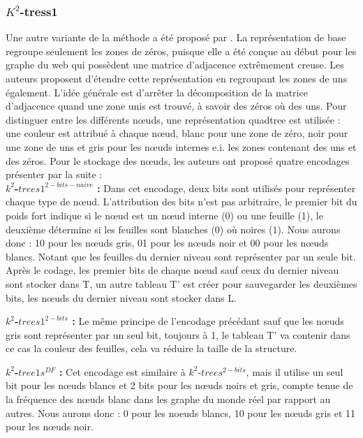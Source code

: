 \subsubsection{$K^2$-tress1 }
Une autre variante de la méthode a été proposé par \citep{de2014new}. La représentation de base regroupe seulement les zones de zéros, puisque elle a été conçue au début pour les graphe du web qui possèdent une matrice d'adjacence extrêmement creuse. Les auteurs proposent d'étendre cette représentation en regroupant les zones de uns également. L'idée générale est d'arrêter la décomposition de la matrice d'adjacence quand une zone unis est trouvé, à savoir des zéros où des uns. Pour distinguer entre les différents nœuds, une représentation quadtree est utilisée \citep{de1997computational} : une couleur est attribué à chaque nœud, blanc pour une zone de zéro, noir pour une zone de uns et gris pour les nœuds internes e.i. les zones contenant des uns et des zéros. Pour le stockage des nœuds, les auteurs ont proposé quatre encodages présenter par la suite : \\

\textbf{ $k^2$-$trees1^{2-bits-naive}$ :} Dans cet encodage, deux bits sont utilisés pour représenter chaque type de nœud. L'attribution des bits n'est pas arbitraire, le premier bit du poids fort indique si le nœud est un nœud interne (0) ou une feuille (1), le deuxième détermine si les feuilles sont blanches (0) où noires (1). Nous aurons donc : 10 pour les nœuds gris, 01 pour les nœuds noir et 00 pour les nœuds blancs. Notant que les feuilles du dernier niveau sont représenter par un seule bit.
Après le codage, les premier bits de chaque nœud sauf ceux du dernier niveau sont stocker dans T, un autre tableau T' est créer pour sauvegarder les deuxièmes bits, les nœuds du dernier niveau sont stocker dans L.

\textbf{ $k^2$-$trees1^{2-bits}$ :} Le même principe de l'encodage précédant sauf que les nœuds gris sont représenter par un seul bit, toujours à 1, le tableau T' va contenir dans ce cas la couleur des feuilles, cela va réduire la taille de la structure.

\textbf{ $k^2$-$tree1s^{DF}$ :} Cet encodage est similaire à $k^2$-$trees^{2-bits}$, mais il utilise un seul bit pour les nœuds blancs et 2 bits pour les nœuds noirs et gris, compte tenue de la fréquence des nœuds blanc dans les graphe du monde réel par rapport au autres. Nous aurons donc : 0 pour les noeuds blancs, 10 pour les nœuds gris et 11 pour les nœuds noir.

